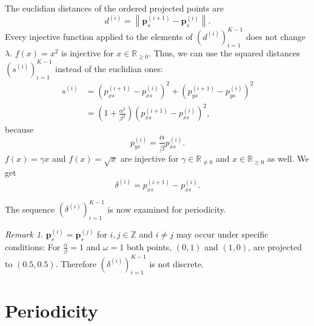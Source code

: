 \documentclass[11pt]{article}
\theoremstyle{remark}
\newtheorem{remark}{Remark}
\begin{document}
The euclidian distances of the ordered projected points are
%
\begin{equation}
d^{(i)} = \left\lVert \mathbf{p}^{(i+1)}_s - \mathbf{p}^{(i)}_s \right\rVert.
\end{equation}
%
Every injective function applied to the elements of $\left(d^{(i)}\right)_{i=1}^{K-1}$ does not change $\lambda$.
%
$f(x) = x^2$ is injective for $x \in \mathbb{R}_{\geq 0}$. Thus, we can use the squared distances $\left(s^{(i)}\right)_{i=1}^{K-1}$ instead of the euclidian ones:
%
\begin{align}
s^{(i)} &= \left(p_{x s}^{(i+1)} - p_{x s}^{(i)}\right)^2 + \left(p_{y s}^{(i+1)} - p_{y s}^{(i)}\right)^2 \\
                      &= \left(1 + \frac{\alpha^2}{\beta^2} \right) \left(p_{x s}^{(i+1)} - p_{x s}^{(i)}\right)^2,
\end{align}
%
because
%
\begin{equation}
p_{y s}^{(i)} = \frac{\alpha}{\beta} p_{x s}^{(i)}.
\end{equation}
%
$f(x) = \gamma x$ and $f(x) = \sqrt{x}$ are injective for $\gamma \in \mathbb{R}_{\ne 0}$ and $x \in \mathbb{R}_{\geq 0}$ as well. We get
%
\begin{equation}
\delta^{(i)} = p_{x s}^{(i+1)} - p_{x s}^{(i)}.\label{eq:delta}
\end{equation}

The sequence $\left(\delta^{(i)}\right)_{i=1}^{K-1}$ is now examined for periodicity.

\begin{remark}
$\mathbf{p}_s^{(i)} = \mathbf{p}_s^{(j)}$ for $i, j \in \mathbb{Z}$ and $i \ne j$ may occur under specific conditions: For $\frac{\alpha}{\beta} = 1$ and $\omega = 1$ both points, $(0, 1)$ and $(1, 0)$, are projected to $(0.5, 0.5)$. Therefore $\left(\delta^{(i)}\right)_{i=1}^{K-1}$ is not discrete.
\end{remark}

\section{Periodicity}
\end{document}

